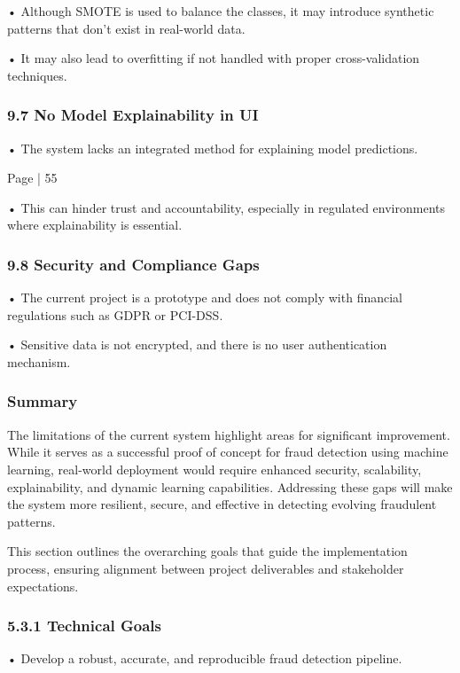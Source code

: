 \documentclass[11pt,a4paper]{article}
\begin{document}
• 
Although SMOTE is used to balance the classes, it may introduce synthetic patterns that 
don’t exist in real-world data. 

• 
It may also lead to overfitting if not handled with proper cross-validation techniques. 

\subsubsection*{9.7 No Model Explainability in UI }

• 
The system lacks an integrated method for explaining model predictions. 

Page | 55  

\newpage

• 
This can hinder trust and accountability, especially in regulated environments where 
explainability is essential. 

\subsubsection*{9.8 Security and Compliance Gaps }

• 
The current project is a prototype and does not comply with financial regulations such as 
GDPR or PCI-DSS. 

• 
Sensitive data is not encrypted, and there is no user authentication mechanism. 

\subsubsection*{Summary }

The limitations of the current system highlight areas for significant improvement. While it serves as 
a successful proof of concept for fraud detection using machine learning, real-world deployment 
would require enhanced security, scalability, explainability, and dynamic learning capabilities. 
Addressing these gaps will make the system more resilient, secure, and effective in detecting 
evolving fraudulent patterns. 

This section outlines the overarching goals that guide the implementation process, ensuring 
alignment between project deliverables and stakeholder expectations. 

\subsubsection*{5.3.1 Technical Goals }

• 
Develop a robust, accurate, and reproducible fraud detection pipeline. 
\end{document}
